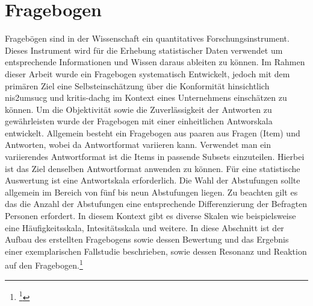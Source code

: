 \documentclass[11pt,a4paper,hidelinks]{article}   %
\begin{document}
    \section{Fragebogen}\label{sec:HerleitungDesFragenkatalog}
        Fragebögen sind in der Wissenschaft ein quantitatives Forschungsinstrument. Dieses Instrument wird für die Erhebung statistischer Daten verwendet um entsprechende Informationen und Wissen daraus ableiten zu können. Im Rahmen dieser Arbeit wurde ein Fragebogen systematisch Entwickelt, jedoch mit dem primären Ziel eine Selbsteinschätzung über die Konformität hinsichtlich \gls{nis2umsucg} und \gls{kritis-dachg} im Kontext eines Unternehmens einschätzen zu können. Um die Objektivität sowie die Zuverlässigkeit der Antworten zu gewährleisten wurde der Fragebogen mit einer einheitlichen Antworskala entwickelt. Allgemein besteht ein Fragebogen aus paaren aus Fragen (Item) und Antworten, wobei da Antwortformat variieren kann. Verwendet man ein variierendes Antwortformat ist die Items in passende Subsets einzuteilen. Hierbei ist das Ziel denselben Antwortformat anwenden zu können. Für eine statistische Auswertung ist eine Antwortskala erforderlich. Die Wahl der Abstufungen sollte allgemein im Bereich von fünf bis neun Abstufungen liegen. Zu beachten gilt es das die Anzahl der Abstufungen eine entsprechende Differenzierung der Befragten Personen erfordert. In diesem Kontext gibt es diverse Skalen wie beispielsweise eine Häufigkeitsskala, Intesitätsskala und weitere. In diese Abschnitt ist der Aufbau des erstellten Fragebogens sowie dessen Bewertung und das Ergebnis einer exemplarischen Fallstudie beschrieben, sowie dessen Resonanz und Reaktion auf den Fragebogen.\footnote{
            \footcite[Vgl. S. 10 - 12, 14 - 16, 40 - 41, 43, 48 - 49, 50, 71 - 76, 79 - 86, 101 - 103, 107 - 112, 115 - 117, 124 - 125, 138, 154][]{9783838544656} %
        }
\end{document}
